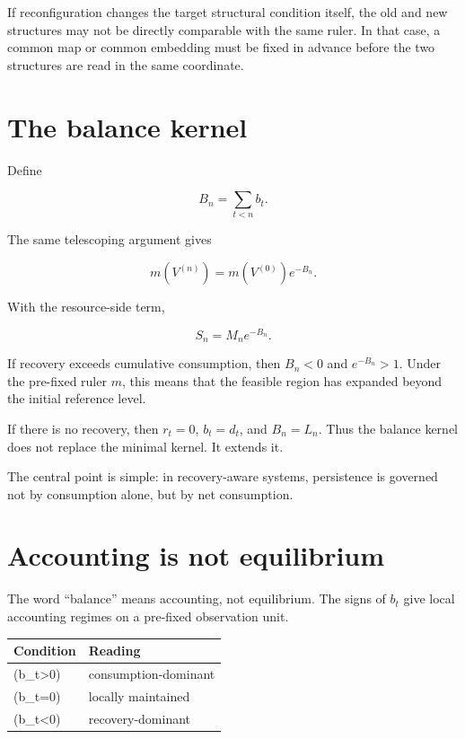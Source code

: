 \documentclass[12pt,a4paper]{article}
\begin{document}
If reconfiguration changes the target structural condition itself, the old and new structures may not be directly comparable with the same ruler. In that case, a common map or common embedding must be fixed in advance before the two structures are read in the same coordinate.

\section{The balance kernel}\label{the-balance-kernel}

Define

\[
B_{n}=\sum_{t<n}b_{t}.
\]

The same telescoping argument gives

\[
m(V^{(n)})=m(V^{(0)})e^{-B_{n}}.
\]

With the resource-side term,

\[
S_{n}=M_{n} e^{-B_{n}}.
\]

If recovery exceeds cumulative consumption, then \(B_{n}<0\) and \(e^{-B_{n}}>1\). Under the pre-fixed ruler \(m\), this means that the feasible region has expanded beyond the initial reference level.

If there is no recovery, then \(r_{t}=0\), \(b_{t}=d_{t}\), and \(B_{n}=L_{n}\). Thus the balance kernel does not replace the minimal kernel. It extends it.

The central point is simple: in recovery-aware systems, persistence is governed not by consumption alone, but by net consumption.

\section{Accounting is not equilibrium}\label{accounting-is-not-equilibrium}

The word ``balance'' means accounting, not equilibrium. The signs of \(b_{t}\) give local accounting regimes on a pre-fixed observation unit.

{\def\LTcaptype{table} %
\begin{longtable}[]{@{}ll@{}}
\toprule\noalign{}
Condition & Reading \\
\midrule\noalign{}
\endhead
\bottomrule\noalign{}
\endlastfoot
(b\_t\textgreater0) & consumption-dominant \\
(b\_t=0) & locally maintained \\
(b\_t\textless0) & recovery-dominant \\
\end{longtable}
}
\end{document}
